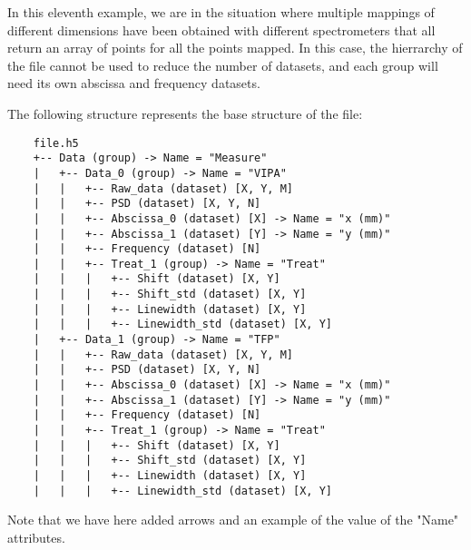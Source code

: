 In this eleventh example, we are in the situation where multiple mappings of different dimensions have been obtained with different spectrometers that all return an array of points for all the points mapped. In this case, the hierrarchy of the file cannot be used to reduce the number of datasets, and each group will need its own abscissa and frequency datasets.

The following structure represents the base structure of the file:
\begin{verbatim}
    file.h5
    +-- Data (group) -> Name = "Measure"
    |   +-- Data_0 (group) -> Name = "VIPA"
    |   |   +-- Raw_data (dataset) [X, Y, M]
    |   |   +-- PSD (dataset) [X, Y, N]
    |   |   +-- Abscissa_0 (dataset) [X] -> Name = "x (mm)"
    |   |   +-- Abscissa_1 (dataset) [Y] -> Name = "y (mm)"
    |   |   +-- Frequency (dataset) [N]
    |   |   +-- Treat_1 (group) -> Name = "Treat"
    |   |   |   +-- Shift (dataset) [X, Y]
    |   |   |   +-- Shift_std (dataset) [X, Y]
    |   |   |   +-- Linewidth (dataset) [X, Y]
    |   |   |   +-- Linewidth_std (dataset) [X, Y]
    |   +-- Data_1 (group) -> Name = "TFP"
    |   |   +-- Raw_data (dataset) [X, Y, M]
    |   |   +-- PSD (dataset) [X, Y, N]
    |   |   +-- Abscissa_0 (dataset) [X] -> Name = "x (mm)"
    |   |   +-- Abscissa_1 (dataset) [Y] -> Name = "y (mm)"
    |   |   +-- Frequency (dataset) [N]
    |   |   +-- Treat_1 (group) -> Name = "Treat"
    |   |   |   +-- Shift (dataset) [X, Y]
    |   |   |   +-- Shift_std (dataset) [X, Y]
    |   |   |   +-- Linewidth (dataset) [X, Y]
    |   |   |   +-- Linewidth_std (dataset) [X, Y]
\end{verbatim}
Note that we have here added arrows and an example of the value of the "Name" attributes.